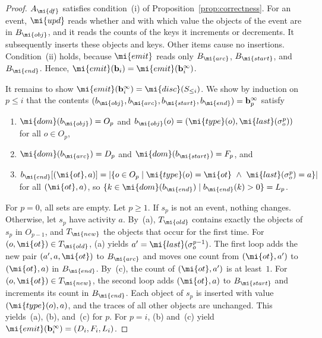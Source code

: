 \begin{proof}
$A_{\mi{df}}$ satisfies condition~(i) of Proposition~\ref{prop:correctness}.
For an event, $\mi{upd}$ reads whether and with which value the objects of the
event are in $B_{\mi{obj}}$, and it reads the counts of the keys it increments
or decrements.
It subsequently inserts these objects and keys.
Other items cause no insertions.
Condition~(ii) holds, because $\mi{emit}$ reads only $B_{\mi{arc}}$,
$B_{\mi{start}}$, and $B_{\mi{end}}$.
Hence, $\mi{emit}(\mathbf{b}_i) = \mi{emit}(\mathbf{b}_i^\infty)$.

It remains to show $\mi{emit}(\mathbf{b}_i^\infty) = \mi{disc}(S_{\le i})$.
We show by induction on $p \le i$ that the contents
$(b_{\mi{obj}}, b_{\mi{arc}}, b_{\mi{start}}, b_{\mi{end}}) = \mathbf{b}_p^\infty$
satisfy
\begin{enumerate}
  \item[(a)] $\mi{dom}(b_{\mi{obj}}) = O_p$ and
        $b_{\mi{obj}}(o) = (\mi{type}(o), \mi{last}(\sigma_o^p))$ for all
        $o \in O_p$,
  \item[(b)] $\mi{dom}(b_{\mi{arc}}) = D_p$ and
        $\mi{dom}(b_{\mi{start}}) = F_p$, and
  \item[(c)] $b_{\mi{end}}[(\mi{ot}, a)] = |\{o \in O_p \mid
        \mi{type}(o) = \mi{ot} \ \wedge\ \mi{last}(\sigma_o^p) = a\}|$ for all
        $(\mi{ot}, a)$, so $\{k \in \mi{dom}(b_{\mi{end}}) \mid b_{\mi{end}}(k) > 0\}
        = L_p$.
\end{enumerate}
For $p = 0$, all sets are empty.
Let $p \ge 1$.
If $s_p$ is not an event, nothing changes.
Otherwise, let $s_p$ have activity $a$.
By~(a), $T_{\mi{old}}$ contains exactly the objects of $s_p$ in $O_{p-1}$, and
$T_{\mi{new}}$ the objects that occur for the first time.
For $(o, \mi{ot}) \in T_{\mi{old}}$, (a) yields
$a' = \mi{last}(\sigma_o^{p-1})$.
The first loop adds the new pair $(a', a, \mi{ot})$ to $B_{\mi{arc}}$ and moves
one count from $(\mi{ot}, a')$ to $(\mi{ot}, a)$ in $B_{\mi{end}}$.
By~(c), the count of $(\mi{ot}, a')$ is at least~$1$.
For $(o, \mi{ot}) \in T_{\mi{new}}$, the second loop adds $(\mi{ot}, a)$ to
$B_{\mi{start}}$ and increments its count in $B_{\mi{end}}$.
Each object of $s_p$ is inserted with value $(\mi{type}(o), a)$, and the traces
of all other objects are unchanged.
This yields~(a), (b), and~(c) for $p$.
For $p = i$, (b) and~(c) yield $\mi{emit}(\mathbf{b}_i^\infty) =
(D_i, F_i, L_i)$.
\end{proof}
